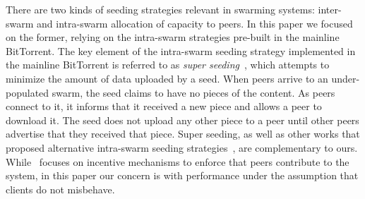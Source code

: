 {There are two kinds of seeding strategies relevant in swarming systems:  inter-swarm and  intra-swarm allocation of capacity to peers.  In this paper we focused on the former, relying on the intra-swarm strategies pre-built in the mainline BitTorrent.  The key element of the intra-swarm seeding strategy implemented in the mainline BitTorrent is referred to as \emph{super seeding}~\cite{wikipedia}, which attempts to minimize the amount of data uploaded by a seed.  When peers arrive to an under-populated swarm, the seed claims to have no pieces of the content.  As peers connect to it, it informs that it received a new piece and allows a peer to download it.  The seed does not upload any other piece to a peer until other peers advertise that they received that piece.  Super seeding, as well as other works that proposed alternative intra-swarm seeding strategies~\cite{bharambe05, legout:07, chow}, are complementary to ours.   While~\cite{wikipedia, bharambe05, legout:07, chow} focuses on incentive mechanisms to enforce that peers contribute to the system, in this paper our concern is with performance under the assumption that clients do not misbehave.






%
%
%

}
